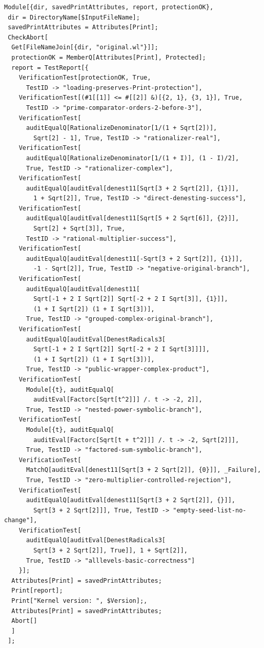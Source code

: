 \documentclass[11pt,letterpaper]{article}
\theoremstyle{definition}
\theoremstyle{remark}
\begin{document}
\begin{lstlisting}
Module[{dir, savedPrintAttributes, report, protectionOK},
 dir = DirectoryName[$InputFileName];
 savedPrintAttributes = Attributes[Print];
 CheckAbort[
  Get[FileNameJoin[{dir, "original.wl"}]];
  protectionOK = MemberQ[Attributes[Print], Protected];
  report = TestReport[{
    VerificationTest[protectionOK, True,
      TestID -> "loading-preserves-Print-protection"],
    VerificationTest[(#1[[1]] <= #[[2]] &)[{2, 1}, {3, 1}], True,
      TestID -> "prime-comparator-orders-2-before-3"],
    VerificationTest[
      auditEqualQ[RationalizeDenominator[1/(1 + Sqrt[2])],
        Sqrt[2] - 1], True, TestID -> "rationalizer-real"],
    VerificationTest[
      auditEqualQ[RationalizeDenominator[1/(1 + I)], (1 - I)/2],
      True, TestID -> "rationalizer-complex"],
    VerificationTest[
      auditEqualQ[auditEval[denest11[Sqrt[3 + 2 Sqrt[2]], {1}]],
        1 + Sqrt[2]], True, TestID -> "direct-denesting-success"],
    VerificationTest[
      auditEqualQ[auditEval[denest11[Sqrt[5 + 2 Sqrt[6]], {2}]],
        Sqrt[2] + Sqrt[3]], True,
      TestID -> "rational-multiplier-success"],
    VerificationTest[
      auditEqualQ[auditEval[denest11[-Sqrt[3 + 2 Sqrt[2]], {1}]],
        -1 - Sqrt[2]], True, TestID -> "negative-original-branch"],
    VerificationTest[
      auditEqualQ[auditEval[denest11[
        Sqrt[-1 + 2 I Sqrt[2]] Sqrt[-2 + 2 I Sqrt[3]], {1}]],
        (1 + I Sqrt[2]) (1 + I Sqrt[3])],
      True, TestID -> "grouped-complex-original-branch"],
    VerificationTest[
      auditEqualQ[auditEval[DenestRadicals3[
        Sqrt[-1 + 2 I Sqrt[2]] Sqrt[-2 + 2 I Sqrt[3]]]],
        (1 + I Sqrt[2]) (1 + I Sqrt[3])],
      True, TestID -> "public-wrapper-complex-product"],
    VerificationTest[
      Module[{t}, auditEqualQ[
        auditEval[Factorc[Sqrt[t^2]]] /. t -> -2, 2]],
      True, TestID -> "nested-power-symbolic-branch"],
    VerificationTest[
      Module[{t}, auditEqualQ[
        auditEval[Factorc[Sqrt[t + t^2]]] /. t -> -2, Sqrt[2]]],
      True, TestID -> "factored-sum-symbolic-branch"],
    VerificationTest[
      MatchQ[auditEval[denest11[Sqrt[3 + 2 Sqrt[2]], {0}]], _Failure],
      True, TestID -> "zero-multiplier-controlled-rejection"],
    VerificationTest[
      auditEqualQ[auditEval[denest11[Sqrt[3 + 2 Sqrt[2]], {}]],
        Sqrt[3 + 2 Sqrt[2]]], True, TestID -> "empty-seed-list-no-change"],
    VerificationTest[
      auditEqualQ[auditEval[DenestRadicals3[
        Sqrt[3 + 2 Sqrt[2]], True]], 1 + Sqrt[2]],
      True, TestID -> "alllevels-basic-correctness"]
    }];
  Attributes[Print] = savedPrintAttributes;
  Print[report];
  Print["Kernel version: ", $Version];,
  Attributes[Print] = savedPrintAttributes;
  Abort[]
  ]
 ];
\end{lstlisting}
\end{document}

